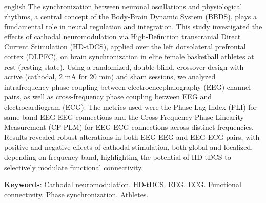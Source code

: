 \begin{resumo}[Abstract]
\begin{otherlanguage*}{english}
The synchronization between neuronal oscillations and physiological rhythms, a central concept of the Body-Brain Dynamic System (BBDS), plays a fundamental role in neural regulation and integration. This study investigated the effects of cathodal neuromodulation via High-Definition transcranial Direct Current Stimulation (HD-tDCS), applied over the left dorsolateral prefrontal cortex (DLPFC), on brain synchronization in elite female basketball athletes at rest (resting-state). Using a randomized, double-blind, crossover design with active (cathodal, 2 mA for 20 min) and sham sessions, we analyzed intrafrequency phase coupling between electroencephalography (EEG) channel pairs, as well as cross-frequency phase coupling between EEG and electrocardiogram (ECG). The metrics used were the Phase Lag Index (PLI) for same-band EEG-EEG connections and the Cross-Frequency Phase Linearity Measurement (CF-PLM) for EEG-ECG connections across distinct frequencies. Results revealed robust alterations in both EEG-EEG and EEG-ECG pairs, with positive and negative effects of cathodal stimulation, both global and localized, depending on frequency band, highlighting the potential of HD-tDCS to selectively modulate functional connectivity.

\vspace{\onelineskip}
 
\noindent 
\textbf{Keywords}: Cathodal neuromodulation. HD-tDCS. EEG. ECG. Functional connectivity. Phase synchronization. Athletes.
\end{otherlanguage*}
\end{resumo}
